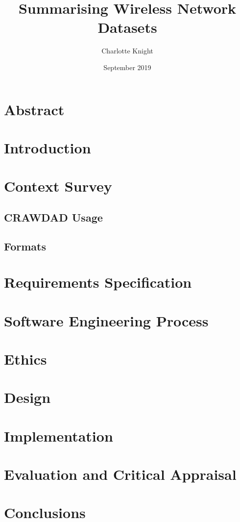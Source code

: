 \documentclass{article}
\title{Summarising Wireless Network Datasets}
\author{Charlotte Knight}
\date{September 2019}
\begin{document}
\maketitle

\section{Abstract}


\newpage
\tableofcontents
\newpage

\section{Introduction}


\section{Context Survey}
    \subsection{CRAWDAD Usage}
    
    
    \subsection{Formats}
    

\section{Requirements Specification}


\section{Software Engineering Process}


\section{Ethics}


\section{Design}


\section{Implementation}


\section{Evaluation and Critical Appraisal}


\section{Conclusions}


\newpage

\nocite{*}
\printbibliography
\end{document}

